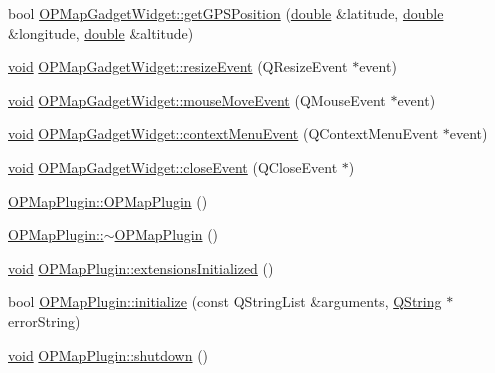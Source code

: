 \begin{DoxyCompactItemize}
\item 
bool \hyperlink{group___o_p_map_plugin_ga9d583efd0d407c4f509e812d454b41e0}{O\-P\-Map\-Gadget\-Widget\-::get\-G\-P\-S\-Position} (\hyperlink{_super_l_u_support_8h_a8956b2b9f49bf918deed98379d159ca7}{double} \&latitude, \hyperlink{_super_l_u_support_8h_a8956b2b9f49bf918deed98379d159ca7}{double} \&longitude, \hyperlink{_super_l_u_support_8h_a8956b2b9f49bf918deed98379d159ca7}{double} \&altitude)
\item 
\hyperlink{group___u_a_v_objects_plugin_ga444cf2ff3f0ecbe028adce838d373f5c}{void} \hyperlink{group___o_p_map_plugin_ga5364db038789e0e4ad94ae0606391100}{O\-P\-Map\-Gadget\-Widget\-::resize\-Event} (Q\-Resize\-Event $\ast$event)
\item 
\hyperlink{group___u_a_v_objects_plugin_ga444cf2ff3f0ecbe028adce838d373f5c}{void} \hyperlink{group___o_p_map_plugin_gac0a4e19ec058721095f125dfba28ea79}{O\-P\-Map\-Gadget\-Widget\-::mouse\-Move\-Event} (Q\-Mouse\-Event $\ast$event)
\item 
\hyperlink{group___u_a_v_objects_plugin_ga444cf2ff3f0ecbe028adce838d373f5c}{void} \hyperlink{group___o_p_map_plugin_gab4575b0db17580cc1a575aafa2fc5710}{O\-P\-Map\-Gadget\-Widget\-::context\-Menu\-Event} (Q\-Context\-Menu\-Event $\ast$event)
\item 
\hyperlink{group___u_a_v_objects_plugin_ga444cf2ff3f0ecbe028adce838d373f5c}{void} \hyperlink{group___o_p_map_plugin_ga07f947001ed1fdf9d099f170e5116aa2}{O\-P\-Map\-Gadget\-Widget\-::close\-Event} (Q\-Close\-Event $\ast$)
\item 
\hyperlink{group___o_p_map_plugin_ga1c402cf38d48ab5c7dacf62490bb5bc2}{O\-P\-Map\-Plugin\-::\-O\-P\-Map\-Plugin} ()
\item 
\hyperlink{group___o_p_map_plugin_gaa1ca844e6b44f8013f6ad72889055c41}{O\-P\-Map\-Plugin\-::$\sim$\-O\-P\-Map\-Plugin} ()
\item 
\hyperlink{group___u_a_v_objects_plugin_ga444cf2ff3f0ecbe028adce838d373f5c}{void} \hyperlink{group___o_p_map_plugin_ga4698621f6178bff1aad1d856fbcc3e08}{O\-P\-Map\-Plugin\-::extensions\-Initialized} ()
\item 
bool \hyperlink{group___o_p_map_plugin_gac6a236b2b4276677428bd2305710a2d7}{O\-P\-Map\-Plugin\-::initialize} (const Q\-String\-List \&arguments, \hyperlink{group___u_a_v_objects_plugin_gab9d252f49c333c94a72f97ce3105a32d}{Q\-String} $\ast$error\-String)
\item 
\hyperlink{group___u_a_v_objects_plugin_ga444cf2ff3f0ecbe028adce838d373f5c}{void} \hyperlink{group___o_p_map_plugin_ga76c3d81f95369b3c96c26739bc07e506}{O\-P\-Map\-Plugin\-::shutdown} ()

\end{DoxyCompactItemize}
